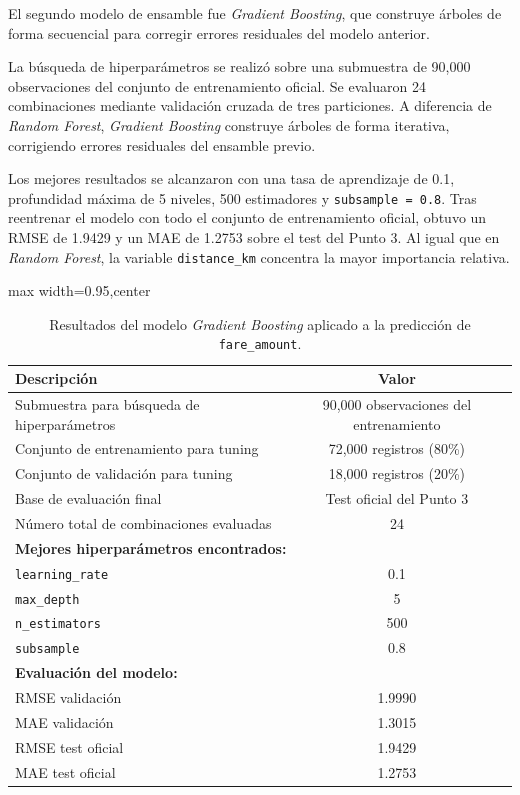 \documentclass[10pt]{article}
\begin{document}
	El segundo modelo de ensamble fue \textit{Gradient Boosting}, que construye árboles de forma secuencial para corregir errores residuales del modelo anterior.

	La búsqueda de hiperparámetros se realizó sobre una submuestra de 90{,}000 observaciones del conjunto de entrenamiento oficial. Se evaluaron 24 combinaciones mediante validación cruzada de tres particiones. A diferencia de \textit{Random Forest}, \textit{Gradient Boosting} construye árboles de forma iterativa, corrigiendo errores residuales del ensamble previo.

	Los mejores resultados se alcanzaron con una tasa de aprendizaje de 0.1, profundidad máxima de 5 niveles, 500 estimadores y \texttt{subsample = 0.8}. Tras reentrenar el modelo con todo el conjunto de entrenamiento oficial, obtuvo un RMSE de 1.9429 y un MAE de 1.2753 sobre el test del Punto 3. Al igual que en \textit{Random Forest}, la variable \texttt{distance\_km} concentra la mayor importancia relativa.

	\begin{table}[!htbp]
		\centering
		\caption{Resultados del modelo \textit{Gradient Boosting} aplicado a la predicción de \texttt{fare\_amount}.}
		\label{tab:gb_resultados}
		\begin{adjustbox}{max width=0.95\textwidth,center}
			\begin{tabular}{lc}
				\hline
				\textbf{Descripción} & \textbf{Valor} \\
				\hline
				Submuestra para búsqueda de hiperparámetros & 90{,}000 observaciones del entrenamiento \\
				Conjunto de entrenamiento para tuning & 72{,}000 registros (80\%) \\
				Conjunto de validación para tuning & 18{,}000 registros (20\%) \\
				Base de evaluación final & Test oficial del Punto 3 \\
				Número total de combinaciones evaluadas & 24 \\
				\hline
				\multicolumn{2}{l}{\textbf{Mejores hiperparámetros encontrados:}} \\
				\hline
				\texttt{learning\_rate} & 0.1 \\
				\texttt{max\_depth} & 5 \\
				\texttt{n\_estimators} & 500 \\
				\texttt{subsample} & 0.8 \\
				\hline
				\multicolumn{2}{l}{\textbf{Evaluación del modelo:}} \\
				\hline
				RMSE validación & 1.9990 \\
				MAE validación & 1.3015 \\
				RMSE test oficial & 1.9429 \\
				MAE test oficial & 1.2753 \\
				\hline
			\end{tabular}
		\end{adjustbox}
	\end{table}
\end{document}
